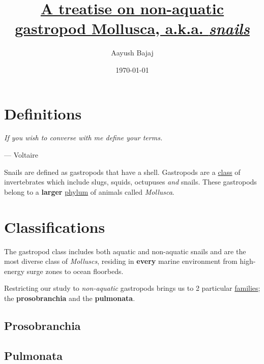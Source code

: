 \documentclass[twoside]{article}
\title{\underline{A treatise on non-aquatic gastropod Mollusca, a.k.a. \emph{snails}}}
\author{Aayush Bajaj}
\date{\today}
\begin{document}
\maketitle %
\thispagestyle{fancy}

\dotfill
\bigbreak

\section*{Definitions}

    \begin{flushright}
    \begin{minipage}{8cm}
        \begin{flushleft} \emph{If you wish to converse with me define your terms.} \end{flushleft}
        \begin{flushright}--- Voltaire\end{flushright}
    \end{minipage}
    \end{flushright}

    Snails are defined as gastropods that have a shell. Gastropods are a \underline{class} of invertebrates which include slugs, squids, octupuses \emph{and} snails. These gastropods belong to a \textbf{larger} \underline{phylum} of animals called \emph{Mollusca}.

\section*{Classifications}
    The gastropod class includes both aquatic and non-aquatic snails and are the most diverse class of \emph{Molluscs}, residing in \textbf{every} marine environment from high-energy surge zones to ocean floorbeds.

    Restricting our study to \emph{non-aquatic} gastropods brings us to 2 particular \underline{families}; the \textbf{prosobranchia} and the \textbf{pulmonata}.

    \subsection*{Prosobranchia}
        
    \subsection*{Pulmonata}
\end{document}
